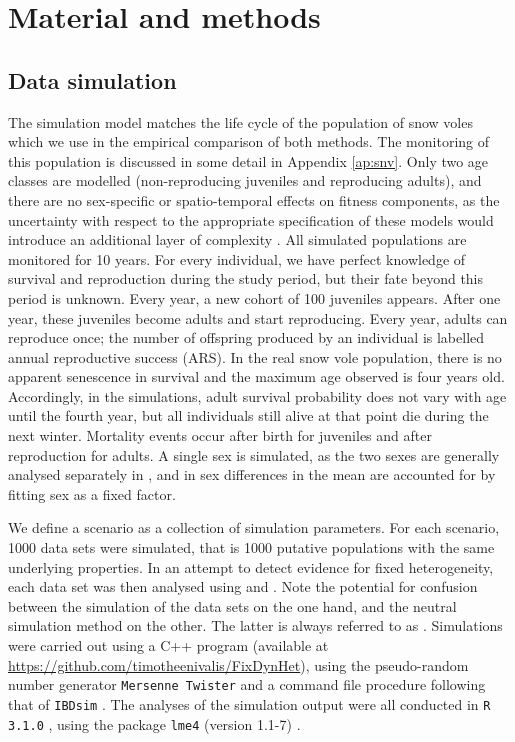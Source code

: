 \section{Material and methods}

\subsection{Data simulation}

The simulation model matches the life cycle of the population of snow voles which we use in the empirical comparison of both methods. The monitoring of this population is discussed in some detail in Appendix \ref{ap:snv}. Only two age classes are modelled (non-reproducing juveniles and reproducing adults), and there are no sex-specific or spatio-temporal effects on fitness components, as the uncertainty with respect to the appropriate specification of these models would introduce an additional layer of complexity \parencite[see e.g.][]{Cam2013}.
All simulated populations are monitored for 10 years. For every individual, we have perfect knowledge of survival and reproduction during the study period, but their fate beyond this period is unknown. Every year, a new cohort of 100 juveniles appears. After one year, these juveniles become adults and start reproducing. Every year, adults can reproduce once; the number of offspring produced by an individual is labelled annual reproductive success (ARS). In the real snow vole population, there is no apparent senescence in survival and the maximum age observed is four years old. Accordingly, in the simulations, adult survival probability does not vary with age until the fourth year, but all individuals still alive at that point die during the next winter. Mortality events occur after birth for juveniles and after reproduction for adults. A single sex is simulated, as the two sexes are generally analysed separately in \NSM, and in \MM sex differences in the mean are accounted for by fitting sex as a fixed factor.

We define a scenario as a collection of simulation parameters. For each scenario, 1000 data sets were simulated, that is 1000 putative populations with the same underlying properties. In an attempt to detect evidence for fixed heterogeneity, each data set was then analysed using \MM and \NSM. Note the potential for confusion between the simulation of the data sets on the one hand, and the neutral simulation method on the other. The latter is always referred to as \NSM. Simulations were carried out using a C++ program (available at \url{https://github.com/timotheenivalis/FixDynHet}), using the pseudo-random number generator \verb+Mersenne Twister+ \parencite{Matsumoto1998} and a command file procedure following that of \verb+IBDsim+ \parencite{Leblois2009}. The analyses of the simulation output were all conducted in \verb+R 3.1.0+ \parencite{R2014}, using the package \verb+lme4+ (version 1.1-7) \parencite{Bates2014a}.

